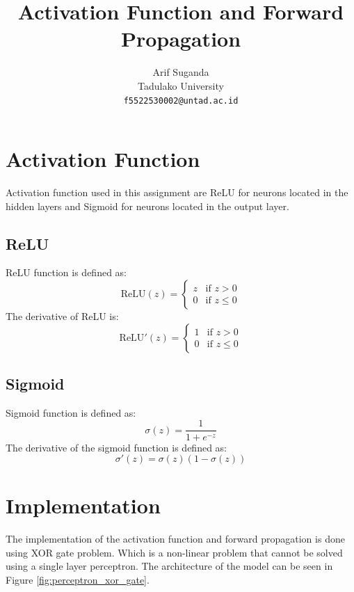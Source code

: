 \documentclass[a4paper,10pt]{article}
\title{Activation Function and Forward Propagation}
\author{Arif Suganda\\
        Tadulako University\\
        \texttt{f5522530002@untad.ac.id}
}
\begin{document}
\maketitle

\section{Activation Function}
Activation function used in this assignment are ReLU for neurons located in the hidden layers and Sigmoid for neurons located in the output layer.
\subsection{ReLU}
ReLU function is defined as:
\begin{equation}
    \text{ReLU}(z) = \begin{cases}
    z & \text{if } z > 0 \\
    0 & \text{if } z \leq 0
    \end{cases}
\end{equation}
\noindent
The derivative of ReLU is:
\begin{equation}
    \text{ReLU}'(z) = \begin{cases}
    1 & \text{if } z > 0 \\
    0 & \text{if } z \leq 0
    \end{cases}
\end{equation}

\subsection{Sigmoid}
Sigmoid function is defined as:
\begin{equation}
    \sigma(z) = \frac{1}{1 + e^{-z}}
\end{equation}
The derivative of the sigmoid function is defined as:
\begin{equation}
    \sigma'(z) = \sigma(z)(1 - \sigma(z))
\end{equation}

\section{Implementation}

The implementation of the activation function and forward propagation is done using XOR gate problem.
Which is a non-linear problem that cannot be solved using a single layer perceptron. 
The architecture of the model can be seen in Figure \ref{fig:perceptron_xor_gate}.
\end{document}
